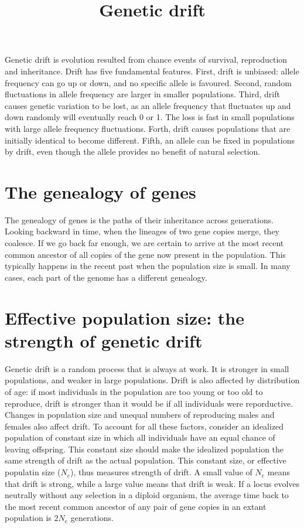 \documentclass[11pt]{article}
\title{Genetic drift}
\author{}
\date{}
\begin{document}
\begin{sloppypar}
  \maketitle

  \linenumbers
Genetic drift is evolution resulted from chance events of survival, reproduction and inheritance. 
Drift has five fundamental features. 
First, drift is unbiased: allele frequency can go up or down, and no specific allele is favoured. 
Second, random fluctuations in allele frequency are larger in smaller populations. 
Third, drift causes genetic variation to be lost, as an allele frequency that fluctuates up and down randomly will eventually reach 0 or 1. 
The loss is fast in small populations with large allele frequency fluctuations. 
Forth, drift causes populations that are initially identical to become different. 
Fifth, an allele can be fixed in populations by drift, even though the allele provides no benefit of natural selection. 

\section{The genealogy of genes}
The genealogy of genes is the paths of their inheritance across generations. 
Looking backward in time, when the lineages of two gene copies merge, they coalesce. 
If we go back far enough, we are certain to arrive at the most recent common ancestor of all copies of the gene now present in the population. 
This typically happens in the recent past when the population size is small. 
In many cases, each part of the genome has a different genealogy. 

\section{Effective population size: the strength of genetic drift}
Genetic drift is a random process that is always at work. 
It is stronger in small populations, and weaker in large populations. 
Drift is also affected by distribution of age: if most individuals in the population are too young or too old to reproduce, drift is stronger than it would be if all individuals were reporductive. 
Changes in population size and unequal numbers of reproducing males and females also affect drift. 
To account for all these factors, consider an idealized population of constant size in which all individuals have an equal chance of leaving offspring. 
This constant size should make the idealized population the same strength of drift as the actual population. 
This constant size, or effective populatin size ($N_e$), thus measures strength of drift. 
A small value of $N_e$ means that drift is strong, while a large value means that drift is weak. 
If a locus evolves neutrally without any selection in a diploid organism, the average time back to the most recent common ancestor of any pair of gene copies in an extant population is $2N_e$ generations. 


\end{sloppypar}
\end{document}
